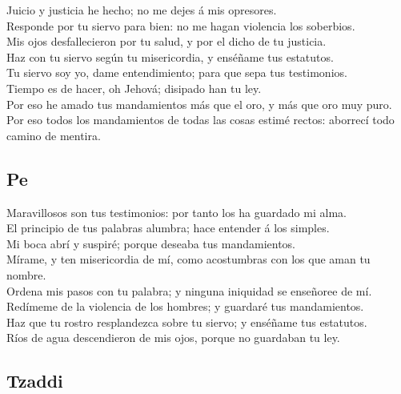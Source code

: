  Juicio y justicia he hecho; no me dejes á mis
opresores.\\
 Responde por tu siervo para bien: no me hagan violencia
los soberbios.\\
 Mis ojos desfallecieron por tu salud, y por el dicho de
tu justicia.\\
 Haz con tu siervo según tu misericordia, y enséñame tus
estatutos.\\
 Tu siervo soy yo, dame entendimiento; para que sepa tus
testimonios.\\
 Tiempo es de hacer, oh Jehová; disipado han tu ley.\\
 Por eso he amado tus mandamientos más que el oro, y más
que oro muy puro.\\
 Por eso todos los mandamientos de todas las cosas estimé
rectos: aborrecí todo camino de mentira.

\hypertarget{pe}{%
\subsection{Pe}\label{pe}}

 Maravillosos son tus testimonios: por tanto los ha
guardado mi alma.\\
 El principio de tus palabras alumbra; hace entender á los
simples.\\
 Mi boca abrí y suspiré; porque deseaba tus
mandamientos.\\
 Mírame, y ten misericordia de mí, como acostumbras con
los que aman tu nombre.\\
 Ordena mis pasos con tu palabra; y ninguna iniquidad se
enseñoree de mí.\\
 Redímeme de la violencia de los hombres; y guardaré tus
mandamientos.\\
 Haz que tu rostro resplandezca sobre tu siervo; y
enséñame tus estatutos.\\
 Ríos de agua descendieron de mis ojos, porque no
guardaban tu ley.

\hypertarget{tzaddi}{%
\subsection{Tzaddi}\label{tzaddi}}

